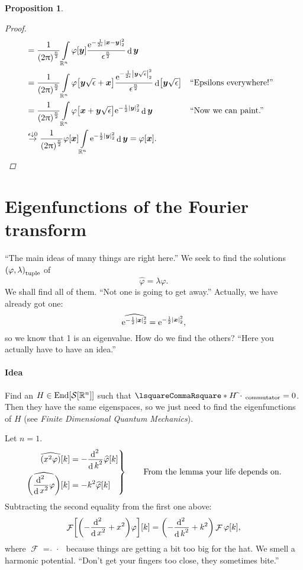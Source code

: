 \documentclass[10pt]{article}
\newtheorem*{proposition}{Proposition}
\DeclarePairedDelimiter\singleBars{\lvert}{\rvert}
\DeclarePairedDelimiter\parentheses{\lparen}{\rparen}
\DeclarePairedDelimiter\squareBrackets{[}{]}
\newcommand\E{\mathrm{e}}
\DeclareMathOperator{\diffd}{d}
\DeclareMathOperator{\FT}{\mathcal{F}}
\DeclareMathOperator{\End}{End}
\newcommand\ft\widehat
\newcommand\deriv[3][]{\frac{\diffd^{#1} {#3}}{{\diffd {#2}}^{#1}}}
\newcommand{\derivop}[2][]{\deriv[#1]{#2}{}}
\newcommand{\R}{\mathbb{R}}
\newcommand{\SchwartzSpace}{\mathcal{S}}
\newcommand\of[1]{\parentheses*{#1}}
\newcommand\pa[1]{\parentheses*{#1}}
\newcommand\tuple[1]{\parentheses*{#1}}
\newcommand\norm[1]{\singleBars*{#1}}
\newcommand\commutator[2]{\lsquareCommaRsquare*{#1}{#2}}
\newcommand\gl\lambda
\newcommand\gj\varphi
\renewcommand\ge\epsilon
\newcommand{\vx}{{\vectorsym x}}
\newcommand{\vy}{{\vectorsym y}}
\newcommand\placeholder{\,\:\cdot\:\,}
\renewcommand\of[1]{\squareBrackets*{#1}}
\renewcommand\norm[1]{\singleBars*{#1}_{2}}
\renewcommand\tuple[1]{\parentheses*{#1}_{\mathrm{tuple}}}
\renewcommand\commutator[2]{\lsquareCommaRsquare*{#1}{#2}_{\mathrm{commutator}}}
\newcommand\Int[1]{\int\limits_{#1}}
\newcommand{\Rn}{{\R^n}}
\newcommand{\Schwartz}{{\SchwartzSpace\of{\Rn}}}
\newcommand{\ftnrm}{\frac{1}{\pa{2\Pi}^\frac{n}{2}} }
\begin{document}
\begin{proposition}
\begin{proof}
\begin{align*}
        &=\ftnrm\Int\Rn\gj\of\vy\frac{\E^{-\frac{1}{2\ge}\norm{\vx-\vy}^2}}
        {\ge^\frac{n}{2}}\diffd\vy \\
        &=\ftnrm\Int\Rn\gj\of{\vy\sqrt\ge+\vx}\frac{\E^{-\frac{1}{2\ge}\norm{\vy\sqrt\ge}^2}}
        {\ge^\frac{n}{2}}\diffd\of{\vy\sqrt\ge} && \text{``Epsilons everywhere!''}\\    
        &=\ftnrm\Int\Rn\gj\of{\vx+\vy\sqrt\ge}\E^{-\frac{1}{2}\norm\vy^2}\diffd\vy
        && \text{``Now we can paint.''}\\
        &\overset{\ge\downarrow 0}{\rightarrow}
        \ftnrm\gj\of\vx\Int\Rn\E^{-\frac{1}{2}\norm\vy^2}\diffd\vy =\gj\of\vx.
      \end{align*}
    \end{proof}
  \end{proposition}
  
  \section{Eigenfunctions of the Fourier transform}
  ``The main ideas of many things are right here.''
  We seek to find the solutions $\tuple{\gj,\gl}$ of
  \begin{equation*}
    \ft\gj=\gl\gj .
  \end{equation*}
  We shall find all of them. ``Not one is going to get away.'' Actually, we have already got one:
  \begin{equation*}
    \ft{\E^{-\frac{1}{2}\norm\vx^2}}=\E^{-\frac{1}{2}\norm\vx^2},
  \end{equation*}
  so we know that 1 is an eigenvalue. How do we find the others? ``Here you actually have to have an idea.''
  
  \paragraph{Idea}
  Find an $H\in\End\of\Schwartz$ such that $\commutator H {\ft\placeholder} = 0$. Then they have the same eigenspaces, so we just need to find the eigenfunctions of $H$ (see \emph{Finite Dimensional Quantum Mechanics}).
  
  Let $n=1$.
  \begin{equation*}
    \left.
    \begin{aligned}
      \ft{\pa{x^2\gj}}\of k &= -\derivop[2]{k}\ft\gj\of k \\
      \ft{\pa{\derivop[2]{x}\gj}}\of k &= -k^2 \ft\gj\of k
    \end{aligned}
    \right\rbrace \qquad \text{From the lemma your life depends on.}
  \end{equation*}
  Subtracting the second equality from the first one above:
  \begin{equation*}
    \FT\of{\pa{-\derivop[2]{x}+x^2}\gj}\of k = \pa{-\derivop[2]{k}+k^2}\FT\gj\of k,
  \end{equation*}
  where $\FT = \ft\placeholder$ because things are getting a bit too big for the hat.
  We smell a harmonic potential. ``Don't get your fingers too close, they sometimes bite.''
  
\end{document}

